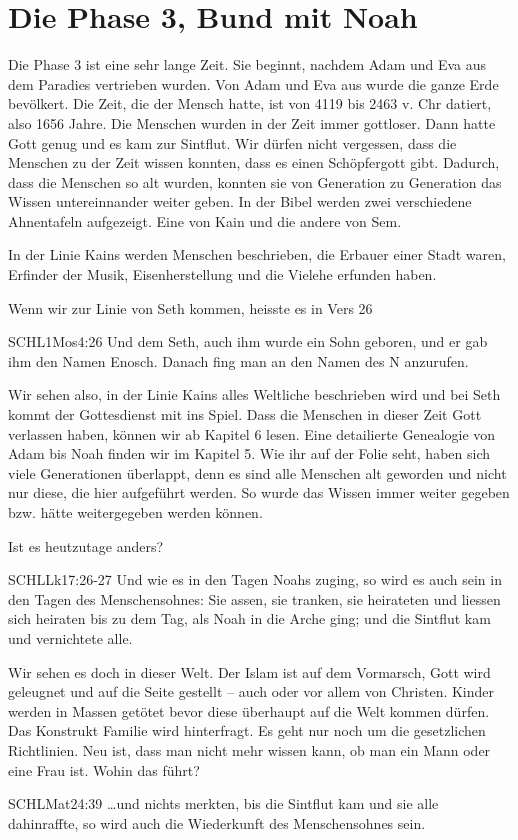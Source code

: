 \section{Die Phase 3, Bund mit Noah}
        Die Phase 3 ist eine sehr lange Zeit. Sie beginnt, nachdem Adam und Eva aus dem Paradies vertrieben wurden. Von Adam und Eva aus wurde die ganze Erde bevölkert. Die Zeit, die der Mensch hatte, ist von 4119 bis 2463 v. Chr datiert, also 1656 Jahre. Die Menschen wurden in der Zeit immer gottloser. Dann hatte Gott genug und es kam zur Sintflut. Wir dürfen nicht vergessen, dass die Menschen zu der Zeit wissen konnten, dass es einen Schöpfergott gibt. Dadurch, dass die Menschen so alt wurden, konnten sie von Generation zu Generation das Wissen untereinnander weiter geben. In der Bibel werden zwei verschiedene Ahnentafeln aufgezeigt. Eine von Kain und die andere von Sem.

        In der Linie Kains werden Menschen beschrieben, die Erbauer einer Stadt waren, Erfinder der Musik, Eisenherstellung und die Vielehe erfunden haben. 

        Wenn wir zur Linie von Seth kommen, heisste es in Vers 26
        \begin{bibelquote}{SCHL}{1Mos}{4:26}
            Und dem Seth, auch ihm wurde ein Sohn geboren, und er gab ihm den Namen Enosch. Danach fing man an den Namen des \herr N anzurufen.
        \end{bibelquote}
        Wir sehen also, in der Linie Kains alles Weltliche beschrieben wird und bei Seth kommt der Gottesdienst mit ins Spiel. Dass die Menschen in dieser Zeit Gott verlassen haben, können wir ab Kapitel 6 lesen. Eine detailierte Genealogie von Adam bis Noah finden wir im Kapitel 5. 
        Wie ihr auf der Folie seht, haben sich viele Generationen überlappt, denn es sind alle Menschen alt geworden und nicht nur diese, die hier aufgeführt werden. So wurde das Wissen immer weiter gegeben bzw. hätte weitergegeben werden können.

        Ist es heutzutage anders?
        \begin{bibelquote}{SCHL}{Lk}{17:26-27}
            Und wie es in den Tagen Noahs zuging, so wird es auch sein in den Tagen des Menschensohnes: Sie assen, sie tranken, sie heirateten und liessen sich heiraten bis zu dem Tag, als Noah in die Arche ging; und die Sintflut kam und vernichtete alle.
        \end{bibelquote}
        Wir sehen es doch in dieser Welt. Der Islam ist auf dem Vormarsch, Gott wird geleugnet und auf die Seite gestellt -- auch oder vor allem von Christen. Kinder werden in Massen getötet bevor diese überhaupt auf die Welt kommen dürfen. Das Konstrukt Familie wird hinterfragt. Es geht nur noch um die gesetzlichen Richtlinien. Neu ist, dass man nicht mehr wissen kann, ob man ein Mann oder eine Frau ist. Wohin das führt?
        \begin{bibelquote}{SCHL}{Mat}{24:39}
            \dots und nichts merkten, bis die Sintflut kam und sie alle dahinraffte, so wird auch die Wiederkunft des Menschensohnes sein.
        \end{bibelquote}

